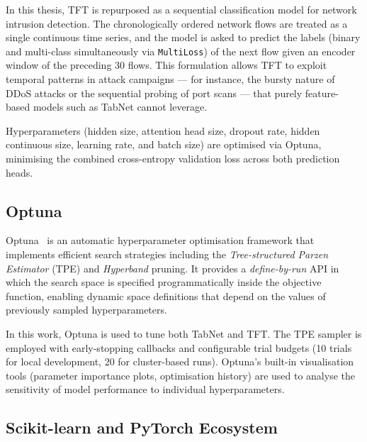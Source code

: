 In this thesis, TFT is repurposed as a sequential classification model for
network intrusion detection.  The chronologically ordered network flows are
treated as a single continuous time series, and the model is asked to predict
the labels (binary and multi-class simultaneously via \texttt{MultiLoss}) of the
next flow given an encoder window of the preceding 30 flows.  This formulation
allows TFT to exploit temporal patterns in attack campaigns — for instance,
the bursty nature of DDoS attacks or the sequential probing of port scans — that
purely feature-based models such as TabNet cannot leverage.

Hyperparameters (hidden size, attention head size, dropout rate, hidden
continuous size, learning rate, and batch size) are optimised via Optuna,
minimising the combined cross-entropy validation loss across both prediction
heads.

\subsection{Optuna}
\label{sec:tech-optuna}

Optuna~\cite{akiba2019optuna} is an automatic hyperparameter optimisation
framework that implements efficient search strategies including the
\emph{Tree-structured Parzen Estimator} (TPE) and \emph{Hyperband} pruning.
It provides a \emph{define-by-run} API in which the search space is specified
programmatically inside the objective function, enabling dynamic space
definitions that depend on the values of previously sampled hyperparameters.

In this work, Optuna is used to tune both TabNet and TFT.  The TPE sampler is
employed with early-stopping callbacks and configurable trial budgets (10
trials for local development, 20 for cluster-based runs).  Optuna's built-in
visualisation tools (parameter importance plots, optimisation history) are used
to analyse the sensitivity of model performance to individual hyperparameters.

\subsection{Scikit-learn and PyTorch Ecosystem}
\label{sec:tech-sklearn-pytorch}

